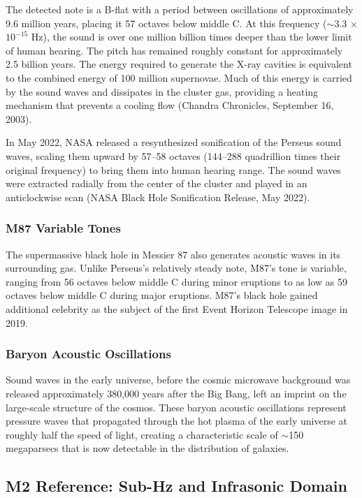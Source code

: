 \documentclass[11pt,letterpaper]{article}
\begin{document}
The detected note is a B-flat with a period between oscillations of approximately 9.6 million years, placing it 57 octaves below middle C. At this frequency ($\sim$3.3 $\times$ $10^{-15}$ Hz), the sound is over one million billion times deeper than the lower limit of human hearing. The pitch has remained roughly constant for approximately 2.5 billion years. The energy required to generate the X-ray cavities is equivalent to the combined energy of 100 million supernovae. Much of this energy is carried by the sound waves and dissipates in the cluster gas, providing a heating mechanism that prevents a cooling flow (Chandra Chronicles, September 16, 2003).

In May 2022, NASA released a resynthesized sonification of the Perseus sound waves, scaling them upward by 57--58 octaves (144--288 quadrillion times their original frequency) to bring them into human hearing range. The sound waves were extracted radially from the center of the cluster and played in an anticlockwise scan (NASA Black Hole Sonification Release, May 2022).

\subsubsection{M87 Variable Tones}
The supermassive black hole in Messier 87 also generates acoustic waves in its surrounding gas. Unlike Perseus's relatively steady note, M87's tone is variable, ranging from 56 octaves below middle C during minor eruptions to as low as 59 octaves below middle C during major eruptions. M87's black hole gained additional celebrity as the subject of the first Event Horizon Telescope image in 2019.

\subsubsection{Baryon Acoustic Oscillations}
Sound waves in the early universe, before the cosmic microwave background was released approximately 380,000 years after the Big Bang, left an imprint on the large-scale structure of the cosmos. These baryon acoustic oscillations represent pressure waves that propagated through the hot plasma of the early universe at roughly half the speed of light, creating a characteristic scale of $\sim$150 megaparsecs that is now detectable in the distribution of galaxies.

\subsection{M2 Reference: Sub-Hz and Infrasonic Domain}
\end{document}
